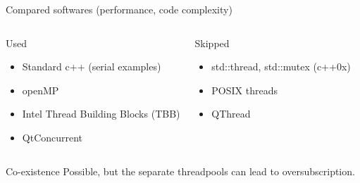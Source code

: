 \documentclass{beamer}
\begin{document}

\begin{frame}{Compared softwares (performance, code complexity)}
\begin{columns}[t]
\column{1.5in}

\begin{block}{Used}
\small
\begin{itemize}
  \item Standard c++ (serial examples)
  \item openMP\cite{openmp}
  \item Intel Thread Building Blocks (TBB)\cite{itbb}
  \item QtConcurrent\cite{qtconcurrent}
\end{itemize}
\end{block}

\column{1.5in}

\begin{block}{Skipped}
\small
\begin{itemize}
  \item std::thread, std::mutex (c++0x)\cite{cpp_thread}
  \item POSIX threads\cite{posix_threads}
  \item QThread\cite{qt_thread}
\end{itemize}
\end{block}

\end{columns}


\begin{exampleblock}{Co-existence\cite{itbb_openmp_nativethreads}}
\small
Possible, but the separate threadpools can lead to oversubscription.
\end{exampleblock}

\end{frame}

\end{document}
